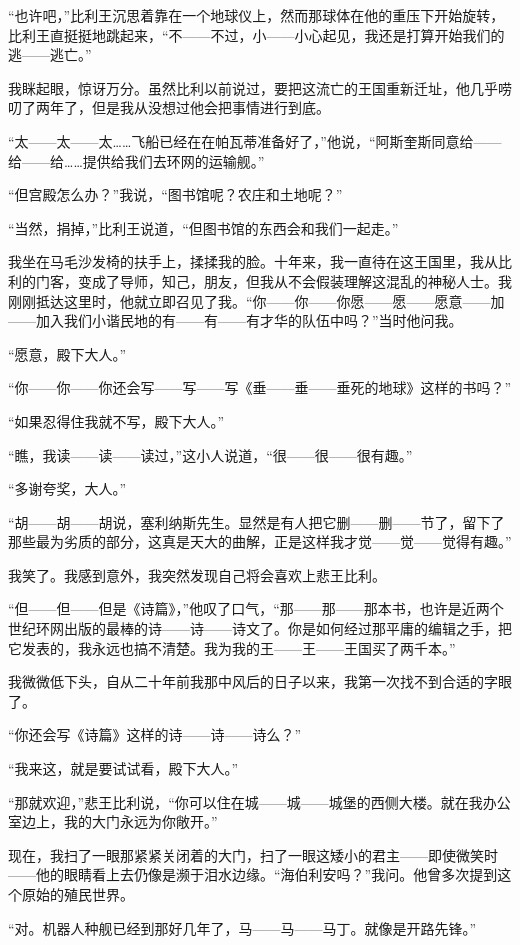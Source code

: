 \documentclass[AutoFakeBold=true]{book}
\begin{document}
``也许吧，''比利王沉思着靠在一个地球仪上，然而那球体在他的重压下开始旋转，比利王直挺挺地跳起来，``不——不过，小——小心起见，我还是打算开始我们的逃——逃亡。''

我眯起眼，惊讶万分。虽然比利以前说过，要把这流亡的王国重新迁址，他几乎唠叨了两年了，但是我从没想过他会把事情进行到底。

``太——太——太……飞船已经在在帕瓦蒂准备好了，''他说，``阿斯奎斯同意给——给——给……提供给我们去环网的运输舰。''

``但宫殿怎么办？''我说，``图书馆呢？农庄和土地呢？''

``当然，捐掉，''比利王说道，``但图书馆的东西会和我们一起走。''

我坐在马毛沙发椅的扶手上，揉揉我的脸。十年来，我一直待在这王国里，我从比利的门客，变成了导师，知己，朋友，但我从不会假装理解这混乱的神秘人士。我刚刚抵达这里时，他就立即召见了我。``你——你——你愿——愿——愿意——加——加入我们小谐民地的有——有——有才华的队伍中吗？''当时他问我。

``愿意，殿下大人。''

``你——你——你还会写——写——写《垂——垂——垂死的地球》这样的书吗？''

``如果忍得住我就不写，殿下大人。''

``瞧，我读——读——读过，''这小人说道，``很——很——很有趣。''

``多谢夸奖，大人。''

``胡——胡——胡说，塞利纳斯先生。显然是有人把它删——删——节了，留下了那些最为劣质的部分，这真是天大的曲解，正是这样我才觉——觉——觉得有趣。''

我笑了。我感到意外，我突然发现自己将会喜欢上悲王比利。

``但——但——但是《诗篇》，''他叹了口气，``那——那——那本书，也许是近两个世纪环网出版的最棒的诗——诗——诗文了。你是如何经过那平庸的编辑之手，把它发表的，我永远也搞不清楚。我为我的王——王——王国买了两千本。''

我微微低下头，自从二十年前我那中风后的日子以来，我第一次找不到合适的字眼了。

``你还会写《诗篇》这样的诗——诗——诗么？''

``我来这，就是要试试看，殿下大人。''

``那就欢迎，''悲王比利说，``你可以住在城——城——城堡的西侧大楼。就在我办公室边上，我的大门永远为你敞开。''

现在，我扫了一眼那紧紧关闭着的大门，扫了一眼这矮小的君主——即使微笑时——他的眼睛看上去仍像是濒于泪水边缘。``海伯利安吗？''我问。他曾多次提到这个原始的殖民世界。

``对。机器人种舰已经到那好几年了，马——马——马丁。就像是开路先锋。''
\end{document}
